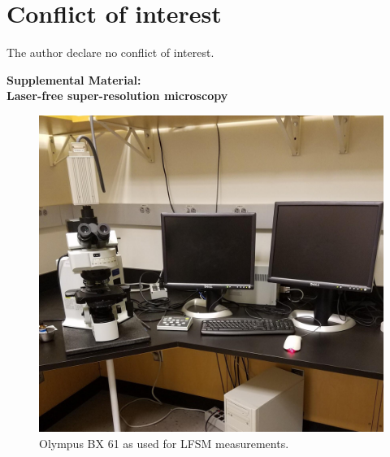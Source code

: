 \documentclass[9pt,twocolumn,twoside]{pnas-new}
\begin{document}
\section*{Conflict of interest}
The author declare no conflict of interest.


\small




\newpage
\onehalfspacing
\onecolumn
\noindent
\textbf{\LARGE Supplemental Material: \\ Laser-free super-resolution microscopy}
\setcounter{figure}{0}
\setcounter{table}{0}
\makeatletter
\renewcommand{\theequation}{S\arabic{equation}}
\renewcommand{\thefigure}{S\arabic{figure}}
\renewcommand{\bibnumfmt}[1]{[S#1]}
\renewcommand{\citenumfont}[1]{S#1}

\newpage
\begin{figure}
\begin{center}
\includegraphics[width=\linewidth]{Figures/SupFig1}
\end{center}
\caption[]{Olympus BX 61 as used for LFSM measurements.} \label{fig:olympus}
\end{figure}
\end{document}
